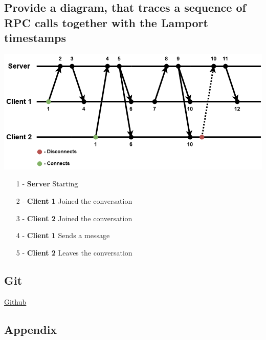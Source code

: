 \documentclass[a4paper,11pt]{article}
\begin{document}
\subsection*{Provide a diagram, that traces a sequence of RPC calls together with the Lamport timestamps}
\includegraphics[width=\textwidth]{chat.png}
\begin{enumerate}
        \setlength{\itemsep}{1pt}
        \setlength{\parskip}{0pt}
        \item[1 - \textbf{Server \;}]Starting
        \item[2 - \textbf{Client 1}] Joined the conversation
        \item[3 - \textbf{Client 2}] Joined the conversation
        \item[4 - \textbf{Client 1}] Sends a message
        \item[5 - \textbf{Client 2}] Leaves the conversation
    \end{enumerate}

\subsection*{Git}
\href{https://github.com/ITU-DISYS2024-CENTRALIZEDSYSTEMS/Chitty-Chat}{Github}

\subsection*{Appendix}
\end{document}
